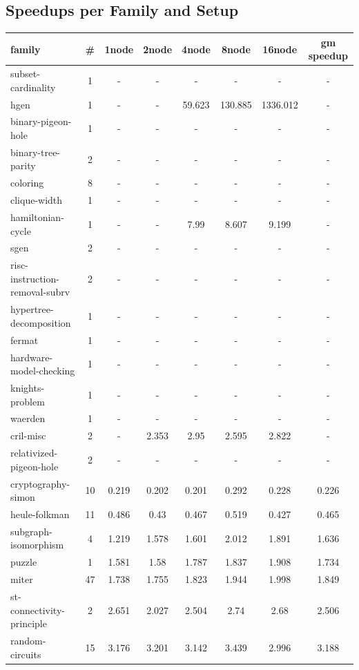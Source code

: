 \documentclass[12pt,a4paper,twoside]{scrartcl}
\numberwithin{equation}{section}
\begin{document}
\subsection{Speedups per Family and Setup}
\label{app:speedupsFamiliesComplete}
\begin{longtable}{ l|c|c|c|c|c|c|c }
    family	&	\#	&	1node	&	2node	&	4node	&	8node	&	16node	&	gm speedup\\
    \hline
    subset-cardinality	&	1	&	-	&	-	&	-	&	-	&	-	&	-\\
    hgen	&	1	&	-	&	-	&	59.623	&	130.885	&	1336.012	&	-\\
    binary-pigeon-hole	&	1	&	-	&	-	&	-	&	-	&	-	&	-\\
    binary-tree-parity	&	2	&	-	&	-	&	-	&	-	&	-	&	-\\
    coloring	&	8	&	-	&	-	&	-	&	-	&	-	&	-\\
    clique-width	&	1	&	-	&	-	&	-	&	-	&	-	&	-\\
    hamiltonian-cycle	&	1	&	-	&	-	&	7.99	&	8.607	&	9.199	&	-\\
    sgen	&	2	&	-	&	-	&	-	&	-	&	-	&	-\\
    risc-instruction-removal-subrv	&	2	&	-	&	-	&	-	&	-	&	-	&	-\\
    hypertree-decomposition	&	1	&	-	&	-	&	-	&	-	&	-	&	-\\
    fermat	&	1	&	-	&	-	&	-	&	-	&	-	&	-\\
    hardware-model-checking	&	1	&	-	&	-	&	-	&	-	&	-	&	-\\
    knights-problem	&	1	&	-	&	-	&	-	&	-	&	-	&	-\\
    waerden	&	1	&	-	&	-	&	-	&	-	&	-	&	-\\
    cril-misc	&	2	&	-	&	2.353	&	2.95	&	2.595	&	2.822	&	-\\
    relativized-pigeon-hole	&	2	&	-	&	-	&	-	&	-	&	-	&	-\\
    cryptography-simon	&	10	&	0.219	&	0.202	&	0.201	&	0.292	&	0.228	&	0.226\\
    heule-folkman	&	11	&	0.486	&	0.43	&	0.467	&	0.519	&	0.427	&	0.465\\
    subgraph-isomorphism	&	4	&	1.219	&	1.578	&	1.601	&	2.012	&	1.891	&	1.636\\
    puzzle	&	1	&	1.581	&	1.58	&	1.787	&	1.837	&	1.908	&	1.734\\
    miter	&	47	&	1.738	&	1.755	&	1.823	&	1.944	&	1.998	&	1.849\\
    st-connectivity-principle	&	2	&	2.651	&	2.027	&	2.504	&	2.74	&	2.68	&	2.506\\
    random-circuits	&	15	&	3.176	&	3.201	&	3.142	&	3.439	&	2.996	&	3.188\\

\end{longtable}
\end{document}
